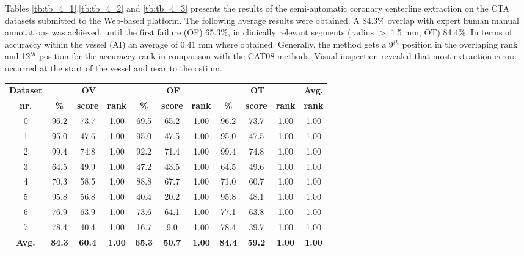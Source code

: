 Tables \ref{tb:tb_4_1},\ref{tb:tb_4_2} and \ref{tb:tb_4_3}  presents the results of the semi-automatic coronary centerline extraction on the CTA datasets submitted to the Web-based platform. The following average results were obtained. A 84.3\% overlap with expert human manual annotations was achieved, until the first failure (OF) 65.3\%, in clinically relevant segments (radius $>$ 1.5 mm, OT) 84.4\%. In terms of accuraccy within the vessel (AI) an average of 0.41 mm where obtained. Generally, the method gets a 9$^{th}$ position in the overlaping rank and 12$^{th}$ position for the accuraccy rank in comparison with the CAT08 methods. Visual inspection revealed that most extraction errors occurred at the start of the vessel and near to the ostium. 

\begin{table*}
\scriptsize
\caption{Average overlap per dataset}
\centering
\begin{tabular}{|c|ccc|ccc|ccc|c|}
\hline
\multicolumn{1}{|c|}{\textbf{Dataset}} &\multicolumn{3}{c|}{\textbf{OV}} &\multicolumn{3}{c|}{\textbf{OF}} &\multicolumn{3}{c|}{\textbf{OT}} &\multicolumn{1}{c|}{\textbf{Avg.}} \\
\multicolumn{1}{|c|}{\textbf{nr.}} &\multicolumn{1}{c|}{\textbf{\%}} &\multicolumn{1}{c|}{\textbf{score}} &\multicolumn{1}{c|}{\textbf{rank}} &\multicolumn{1}{c|}{\textbf{\%}} &\multicolumn{1}{c|}{\textbf{score}} &\multicolumn{1}{c|}{\textbf{rank}} &\multicolumn{1}{c|}{\textbf{\%}} &\multicolumn{1}{c|}{\textbf{score}} &\multicolumn{1}{c|}{\textbf{rank}} &\multicolumn{1}{c|}{\textbf{rank}}\\
\hline
0&96.2&73.7& 1.00&69.5&65.2& 1.00&96.2&73.7& 1.00& 1.00\\
1&95.0&47.6& 1.00&95.0&47.5& 1.00&95.0&47.5& 1.00& 1.00\\
2&99.4&74.8& 1.00&92.2&71.4& 1.00&99.4&74.8& 1.00& 1.00\\
3&64.5&49.9& 1.00&47.2&43.5& 1.00&64.5&49.6& 1.00& 1.00\\
4&70.3&58.5& 1.00&88.8&67.7& 1.00&71.0&60.7& 1.00& 1.00\\
5&95.8&56.8& 1.00&40.4&20.2& 1.00&95.8&48.1& 1.00& 1.00\\
6&76.9&63.9& 1.00&73.6&64.1& 1.00&77.1&63.8& 1.00& 1.00\\
7&78.4&40.4& 1.00&16.7&9.0& 1.00&78.4&39.7& 1.00& 1.00\\
\hline
\textbf{Avg.}&\textbf{84.3}&\textbf{60.4}&\textbf{ 1.00}&\textbf{65.3}&\textbf{50.7}&\textbf{ 1.00}&\textbf{84.4}&\textbf{59.2}&\textbf{ 1.00}&\textbf{ 1.00}\\
\hline
\end{tabular}
\vspace{-0.3cm}
\label{tb:tb_4_1}
\normalsize
\end{table*}

